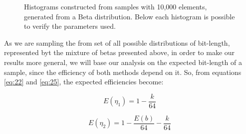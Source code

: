 \documentclass[10pt]{article}
\begin{document}
\begin{figure}[ht]
{  }
  \caption{Histograms constructed from samples with 10,000 elements, generated from a Beta distribution. Below each histogram is possible to verify the parameters used.}
  \label{fig:02}
\end{figure}

As we are sampling the from set of all possible distributions of bit-length, represented byt the mixture of betas presented above, in order to make our results more general, we will base our analysis on the expected bit-length of a sample, since the efficiency of both methods  depend on it. So, from equations \ref{eq:22} and \ref{eq:25}, the expected efficiencies become: 
 
\begin{equation}\label{eq:56}
 E(\eta_1) = 1 - \frac{k}{64}
\end{equation}

\begin{equation}\label{eq:57}
 E(\eta_2) = 1 - \frac{E(b)}{64} - \frac{k}{64}
\end{equation}
\end{document}

